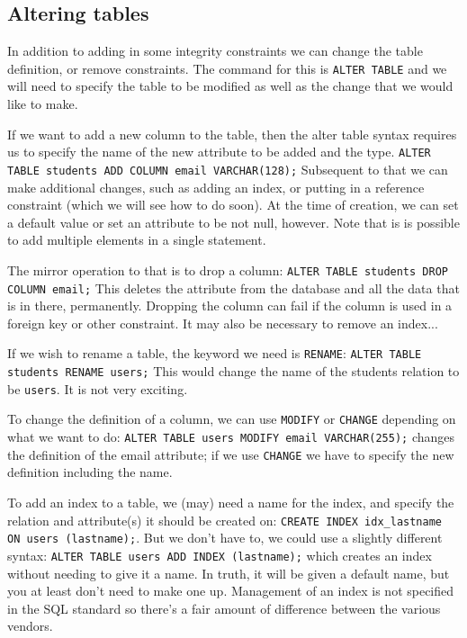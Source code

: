 \subsection*{Altering tables}

In addition to adding in some integrity constraints we can change the table definition, or remove constraints. The command for this is \texttt{ALTER TABLE} and we will need to specify the table to be modified as well as the change that we would like to make. 

If we want to add a new column to the table, then the alter table syntax requires us to specify the name of the new attribute to be added and the type. \texttt{ALTER TABLE students ADD COLUMN email VARCHAR(128);} Subsequent to that we can make additional changes, such as adding an index, or putting in a reference constraint (which we will see how to do soon). At the time of creation, we can set a default value or set an attribute to be not null, however. Note that is is possible to add multiple elements in a single statement. 

The mirror operation to that is to drop a column: \texttt{ALTER TABLE students DROP COLUMN email;} This deletes the attribute from the database and all the data that is in there, permanently. Dropping the column can fail if the column is used in a foreign key or other constraint. It may also be necessary to remove an index... 

If we wish to rename a table, the keyword we need is \texttt{RENAME}: \texttt{ALTER TABLE students RENAME users;} This would change the name of the students relation to be \texttt{users}. It is not very exciting.

To change the definition of a column, we can use \texttt{MODIFY} or \texttt{CHANGE} depending on what we want to do: \texttt{ALTER TABLE users MODIFY email VARCHAR(255);} changes the definition of the email attribute; if we use \texttt{CHANGE} we have to specify the new definition including the name.

To add an index to a table, we (may) need a name for the index, and specify the relation and attribute(s) it should be created on: \texttt{CREATE INDEX idx\_lastname ON users (lastname);}. But we don't have to, we could use a slightly different syntax: \texttt{ALTER TABLE users ADD INDEX (lastname);} which creates an index without needing to give it a name. In truth, it will be given a default name, but you at least don't need to make one up. Management of an index is not specified in the SQL standard so there's a fair amount of difference between the various vendors.

